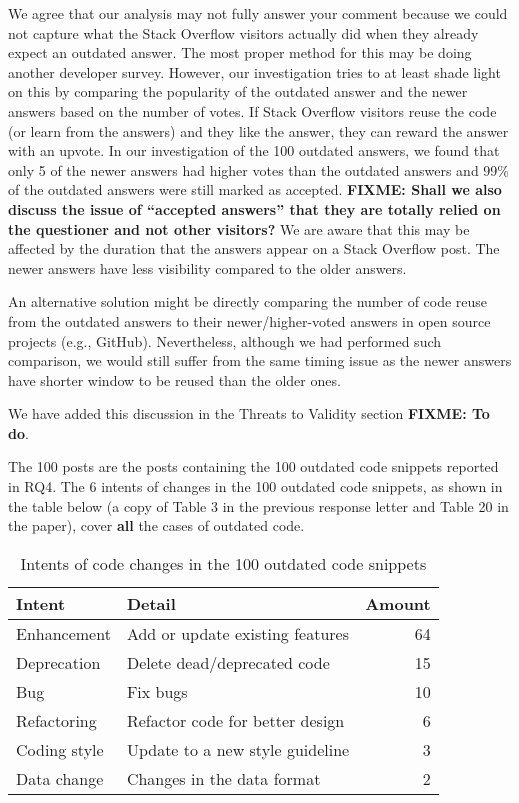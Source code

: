 \documentclass[a4paper,twoside,10pt]{reviewresponse}
\newcommand\FIXME[1]{{\color{red}\textbf{FIXME: #1}}}
\begin{document}
We agree that our analysis may not fully answer your comment because we could not capture what the Stack Overflow visitors actually did when they already expect an outdated answer. The most proper method for this may be doing another developer survey. However, our investigation tries to at least shade light on this by comparing the popularity of the outdated answer and the newer answers based on the number of votes. If Stack Overflow visitors reuse the code (or learn from the answers) and they like the answer, they can reward the answer with an upvote. In our investigation of the 100 outdated answers, we found that only 5 of the newer answers had higher votes than the outdated answers and 99\% of the outdated answers were still marked as accepted. \FIXME{Shall we also discuss the issue of ``accepted answers'' that they are totally relied on the questioner and not other visitors?} We are aware that this may be affected by the duration that the answers appear on a Stack Overflow post. The newer answers have less visibility compared to the older answers. 

An alternative solution might be directly comparing the number of code reuse from the outdated answers to their newer/higher-voted answers in open source projects (e.g., GitHub). 
Nevertheless, although we had performed such comparison, we would still suffer from the same timing issue as the newer answers have shorter window to be reused than the older ones.

We have added this discussion in the Threats to Validity section \FIXME{To do}.


The 100 posts are the posts containing the 100 outdated code snippets reported in RQ4. The 6 intents of changes in the 100 outdated code snippets, as shown in the table below (a copy of Table 3 in the previous response letter and Table 20 in the paper), cover \textbf{all} the cases of outdated code. 

\begin{table}[H]
	\centering
	\begin{tabular}{llr}
		\toprule
		Intent & Detail & Amount \\
		\midrule
		Enhancement & Add or update existing features & 64 \\
		Deprecation & Delete dead/deprecated code & 15 \\
		Bug & Fix bugs & 10 \\
		Refactoring & Refactor code for better design & 6 \\
		Coding style & Update to a new style guideline & 3 \\
		Data change & Changes in the data format & 2 \\
		\bottomrule
	\end{tabular}
	\label{tab:intent_outdated}
	\caption{Intents of code changes in the 100 outdated code snippets}
\end{table}
\end{document}

